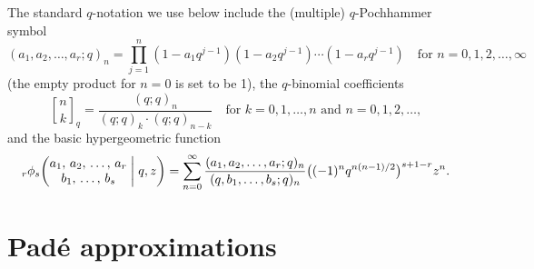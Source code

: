 \documentclass[12pt,reqno]{amsart}
\theoremstyle{remark}
\newcommand{\qbinom}[2]{{\genfrac{[}{]}{0pt}{}{#1}{#2}}_q}
\begin{document}
\medskip
The standard $q$-notation \cite{GR04} we use below include the (multiple) $q$-Pochhammer symbol
$$
(a_1,a_2,\dots,a_r;q)_n=\prod_{j=1}^n(1-a_1q^{j-1})(1-a_2q^{j-1})\dotsb(1-a_rq^{j-1})
\quad\text{for $n=0,1,2,\dots,\infty$}
$$
(the empty product for $n=0$ is set to be 1), the $q$-binomial coefficients
$$
\qbinom nk=\frac{(q;q)_n}{(q;q)_k\cdot(q;q)_{n-k}}
\quad\text{for $k=0,1,\dots,n$ and $n=0,1,2,\dots$},
$$
and the basic hypergeometric function
$$
{}_r\phi_s\biggl(\begin{matrix} a_1, \, a_2, \, \dots, \, a_r \\ b_1, \, \dots, \, b_s \end{matrix} \biggm|q,z\biggr)
=\sum_{n=0}^\infty\frac{(a_1,a_2,\dots,a_r;q)_n}{(q,b_1,\dots,b_s;q)_n}\bigl((-1)^nq^{n(n-1)/2}\bigr)^{s+1-r}z^n.
$$

\section{Pad\'e approximations}
\label{s3}
\end{document}
